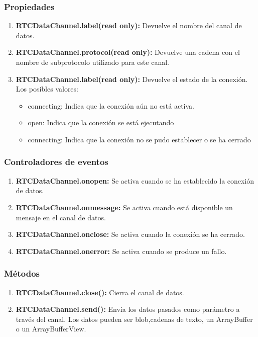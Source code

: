 \subsubsection*{Propiedades}
\begin{enumerate}
\item \textbf{RTCDataChannel.label(read only):} Devuelve el nombre del canal de datos.
\item \textbf{RTCDataChannel.protocol(read only):} Devuelve una cadena con el nombre de subprotocolo utilizado para este canal.
\item \textbf{RTCDataChannel.label(read only):} Devuelve el estado de la conexión. Los posibles valores:
  \begin{itemize}
    \item connecting: Indica que la conexión aún no está activa.
    \item open: Indica que la conexión se está ejecutando
    \item connecting: Indica que la conexión no se pudo establecer o se ha cerrado
  \end{itemize}
\end{enumerate}
\subsubsection*{Controladores de eventos}
\begin{enumerate}
\item \textbf{RTCDataChannel.onopen:} Se activa cuando se ha establecido la conexión de datos.
\item \textbf{RTCDataChannel.onmessage:} Se activa cuando está disponible un mensaje en el canal de datos.
\item \textbf{RTCDataChannel.onclose:} Se activa cuando la conexión se ha cerrado.
\item \textbf{RTCDataChannel.onerror:} Se activa cuando se produce un fallo.
\end{enumerate}
\subsubsection*{Métodos}
\begin{enumerate}
\item \textbf{RTCDataChannel.close():} Cierra el canal de datos.
\item \textbf{RTCDataChannel.send():} Envía los datos pasados como parámetro a través del canal. Los datos pueden ser blob,cadenas de texto, un ArrayBuffer o un ArrayBufferView.
\end{enumerate}
